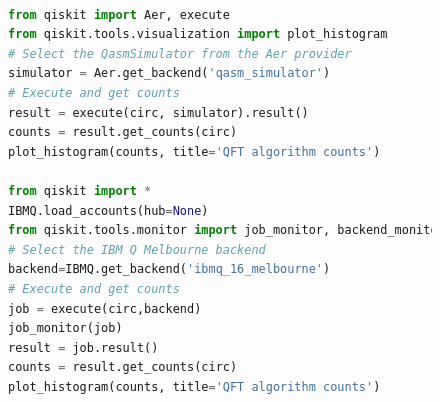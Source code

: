 \begin{figure}[h!]
\begin{lstlisting}[language=Python]%[language=Python, caption=Python example]

from qiskit import Aer, execute
from qiskit.tools.visualization import plot_histogram
# Select the QasmSimulator from the Aer provider
simulator = Aer.get_backend('qasm_simulator')
# Execute and get counts
result = execute(circ, simulator).result()
counts = result.get_counts(circ)
plot_histogram(counts, title='QFT algorithm counts')

from qiskit import *
IBMQ.load_accounts(hub=None)
from qiskit.tools.monitor import job_monitor, backend_monitor, backend_overview
# Select the IBM Q Melbourne backend
backend=IBMQ.get_backend('ibmq_16_melbourne')
# Execute and get counts
job = execute(circ,backend)
job_monitor(job)
result = job.result()
counts = result.get_counts(circ)
plot_histogram(counts, title='QFT algorithm counts')
 

\end{lstlisting}
\end{figure}

